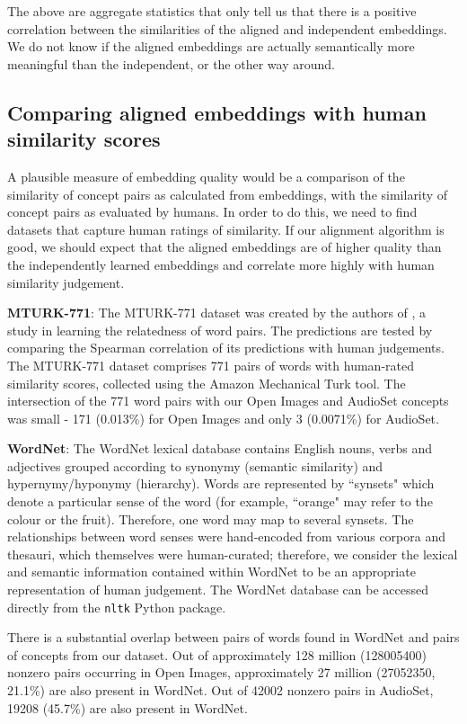 The above are aggregate statistics that only tell us that there is a positive correlation between the similarities of the aligned and independent embeddings. We do not know if the aligned embeddings are actually semantically more meaningful than the independent, or the other way around. 

\subsection{Comparing aligned embeddings with human similarity scores}

A plausible measure of embedding quality would be a comparison of the similarity of concept pairs as calculated from embeddings, with the similarity of concept pairs as evaluated by humans. In order to do this, we need to find datasets that capture human ratings of similarity. If our alignment algorithm is good, we should expect that the aligned embeddings are of higher quality than the independently learned embeddings and correlate more highly with human similarity judgement. 

\textbf{MTURK-771}: The MTURK-771 dataset was created by the authors of \cite{mturk771}, a study in learning the relatedness of word pairs. The predictions are tested by comparing the Spearman correlation of its predictions with human judgements. The MTURK-771 dataset comprises 771 pairs of words with human-rated similarity scores, collected using the Amazon Mechanical Turk tool. The intersection of the 771 word pairs with our Open Images and AudioSet concepts was small - 171 (0.013\%)  for Open Images and only 3 (0.0071\%) for AudioSet. 

\textbf{WordNet}: The WordNet \cite{WordNet} lexical database contains English nouns, verbs and adjectives grouped according to synonymy (semantic similarity) and hypernymy/hyponymy (hierarchy). Words are represented by ``synsets" which denote a particular sense of the word (for example, ``orange" may refer to the colour or the fruit). Therefore, one word may map to several synsets. The relationships between word senses were hand-encoded from various corpora and thesauri, which themselves were human-curated; therefore, we consider the lexical and semantic information contained within WordNet to be an appropriate representation of human judgement. The WordNet database can be accessed directly from the \texttt{nltk} Python package. 

There is a substantial overlap between pairs of words found in WordNet and pairs of concepts from our dataset.  Out of approximately 128 million (128005400) nonzero pairs occurring in Open Images, approximately 27 million (27052350, 21.1\%) are also present in WordNet. Out of 42002 nonzero pairs in AudioSet, 19208 (45.7\%) are also present in WordNet. 

